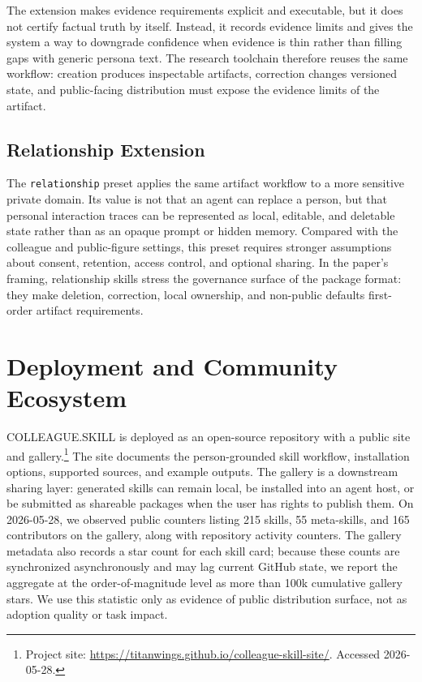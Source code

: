 \documentclass{llmxive}
\providecommand{\system}{\textsc{COLLEAGUE.SKILL}\xspace}
\begin{document}
The extension makes evidence requirements explicit and executable, but it does not certify factual truth by itself. Instead, it records evidence limits and gives the system a way to downgrade confidence when evidence is thin rather than filling gaps with generic persona text. The research toolchain therefore reuses the same workflow: creation produces inspectable artifacts, correction changes versioned state, and public-facing distribution must expose the evidence limits of the artifact.

\subsection{Relationship Extension}

The \texttt{relationship} preset applies the same artifact workflow to a more sensitive private domain. Its value is not that an agent can replace a person, but that personal interaction traces can be represented as local, editable, and deletable state rather than as an opaque prompt or hidden memory. Compared with the colleague and public-figure settings, this preset requires stronger assumptions about consent, retention, access control, and optional sharing. In the paper's framing, relationship skills stress the governance surface of the package format: they make deletion, correction, local ownership, and non-public defaults first-order artifact requirements.

\section{Deployment and Community Ecosystem}

\system is deployed as an open-source repository with a public site and gallery.\footnote{Project site: \url{https://titanwings.github.io/colleague-skill-site/}. Accessed 2026-05-28.} The site documents the person-grounded skill workflow, installation options, supported sources, and example outputs. The gallery is a downstream sharing layer: generated skills can remain local, be installed into an agent host, or be submitted as shareable packages when the user has rights to publish them. On 2026-05-28, we observed public counters listing 215 skills, 55 meta-skills, and 165 contributors on the gallery, along with repository activity counters. The gallery metadata also records a star count for each skill card; because these counts are synchronized asynchronously and may lag current GitHub state, we report the aggregate at the order-of-magnitude level as more than 100k cumulative gallery stars. We use this statistic only as evidence of public distribution surface, not as adoption quality or task impact.
\end{document}

